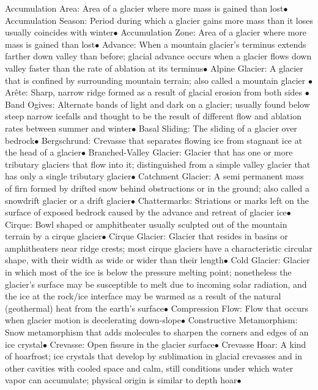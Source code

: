 \documentclass{article}
\newcommand{\ddd}{$\bullet$}
\begin{document}
\begin{multicols*}{4}
        Accumulation Area: Area of a glacier where more mass is gained than lost\ddd
        Accumulation Season: Period during which a glacier gains more mass than it loses usually coincides with winter\ddd
        Accumulation Zone: Area of a glacier where more mass is gained than lost\ddd
        Advance: When a mountain glacier’s terminus extends farther down valley than before; glacial advance occurs when a glacier flows down valley faster than the rate of ablation at its terminus\ddd
        Alpine Glacier: A glacier that is confined by surrounding mountain terrain; also called a mountain glacier \ddd
        Arête: Sharp, narrow ridge formed as a result of glacial erosion from both sides \ddd 
        Band Ogives: Alternate bands of light and dark on a glacier; usually found below steep narrow icefalls and thought to be the result of different flow and ablation rates between summer and winter\ddd
        Basal Sliding: The sliding of a glacier over bedrock\ddd
        Bergschrund: Crevasse that separates flowing ice from stagnant ice at the head of a glacier\ddd
        Branched-Valley Glacier: Glacier that has one or more tributary glaciers that flow into it; distinguished from a simple valley glacier that has only a single tributary glacier\ddd
        Catchment Glacier: A semi permanent mass of firn formed by drifted snow behind obstructions or in the ground; also called a snowdrift glacier or a drift glacier\ddd
        Chattermarks: Striations or marks left on the surface of exposed bedrock caused by the advance and retreat of glacier ice\ddd
        Cirque: Bowl shaped or amphitheater usually sculpted out of the mountain terrain by a cirque glacier\ddd
        Cirque Glacier: Glacier that resides in basins or amphitheaters near ridge crests; most cirque glaciers have a characteristic circular shape, with their width as wide or wider than their length\ddd
        Cold Glacier: Glacier in which most of the ice is below the pressure melting point; nonetheless the glacier’s surface may be susceptible to melt due to incoming solar radiation, and the ice at the rock/ice interface may be warmed as a result of the natural (geothermal) heat from the earth’s surface\ddd
        Compression Flow: Flow that occurs when glacier motion is decelerating down-slope\ddd
        Constructive Metamorphism: Snow metamorphism that adds molecules to sharpen the corners and edges of an ice crystal\ddd
        Crevasse: Open fissure in the glacier surface\ddd
        Crevasse Hoar: A kind of hoarfrost; ice crystals that develop by sublimation in glacial crevasses and in other cavities with cooled space and calm, still conditions under which water vapor can accumulate; physical origin is similar to depth hoar\ddd

\end{multicols*}
\end{document}
